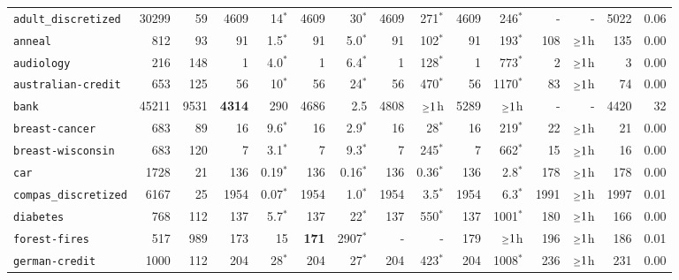 \begin{tabular}{lccrrrrrrrrrrrr}
\texttt{adult\_discretized} & \multicolumn{1}{r}{30299} & \multicolumn{1}{r}{59}  & 4609 & 14$^*$ & 4609 & 30$^*$ & 4609 & 271$^*$ & 4609 & 246$^*$ & - & - & 5022 & 0.06\\
\texttt{anneal} & \multicolumn{1}{r}{812} & \multicolumn{1}{r}{93}  & 91 & 1.5$^*$ & 91 & 5.0$^*$ & 91 & 102$^*$ & 91 & 193$^*$ & 108 & $\mathsmaller{\geq}1$h & 135 & 0.00\\
\texttt{audiology} & \multicolumn{1}{r}{216} & \multicolumn{1}{r}{148}  & 1 & 4.0$^*$ & 1 & 6.4$^*$ & 1 & 128$^*$ & 1 & 773$^*$ & 2 & $\mathsmaller{\geq}1$h & 3 & 0.00\\
\texttt{australian-credit} & \multicolumn{1}{r}{653} & \multicolumn{1}{r}{125}  & 56 & 10$^*$ & 56 & 24$^*$ & 56 & 470$^*$ & 56 & 1170$^*$ & 83 & $\mathsmaller{\geq}1$h & 74 & 0.00\\
\texttt{bank} & \multicolumn{1}{r}{45211} & \multicolumn{1}{r}{9531}  & \textbf{4314} & 290 & 4686 & 2.5 & 4808 & $\mathsmaller{\geq}1$h & 5289 & $\mathsmaller{\geq}1$h & - & - & 4420 & 32\\
\texttt{breast-cancer} & \multicolumn{1}{r}{683} & \multicolumn{1}{r}{89}  & 16 & 9.6$^*$ & 16 & 2.9$^*$ & 16 & 28$^*$ & 16 & 219$^*$ & 22 & $\mathsmaller{\geq}1$h & 21 & 0.00\\
\texttt{breast-wisconsin} & \multicolumn{1}{r}{683} & \multicolumn{1}{r}{120}  & 7 & 3.1$^*$ & 7 & 9.3$^*$ & 7 & 245$^*$ & 7 & 662$^*$ & 15 & $\mathsmaller{\geq}1$h & 16 & 0.00\\
\texttt{car} & \multicolumn{1}{r}{1728} & \multicolumn{1}{r}{21}  & 136 & 0.19$^*$ & 136 & 0.16$^*$ & 136 & 0.36$^*$ & 136 & 2.8$^*$ & 178 & $\mathsmaller{\geq}1$h & 178 & 0.00\\
\texttt{compas\_discretized} & \multicolumn{1}{r}{6167} & \multicolumn{1}{r}{25}  & 1954 & 0.07$^*$ & 1954 & 1.0$^*$ & 1954 & 3.5$^*$ & 1954 & 6.3$^*$ & 1991 & $\mathsmaller{\geq}1$h & 1997 & 0.01\\
\texttt{diabetes} & \multicolumn{1}{r}{768} & \multicolumn{1}{r}{112}  & 137 & 5.7$^*$ & 137 & 22$^*$ & 137 & 550$^*$ & 137 & 1001$^*$ & 180 & $\mathsmaller{\geq}1$h & 166 & 0.00\\
\texttt{forest-fires} & \multicolumn{1}{r}{517} & \multicolumn{1}{r}{989}  & 173 & 15 & \textbf{171} & 2907$^*$ & - & - & 179 & $\mathsmaller{\geq}1$h & 196 & $\mathsmaller{\geq}1$h & 186 & 0.01\\
\texttt{german-credit} & \multicolumn{1}{r}{1000} & \multicolumn{1}{r}{112}  & 204 & 28$^*$ & 204 & 27$^*$ & 204 & 423$^*$ & 204 & 1008$^*$ & 236 & $\mathsmaller{\geq}1$h & 231 & 0.00\\

\end{tabular}
